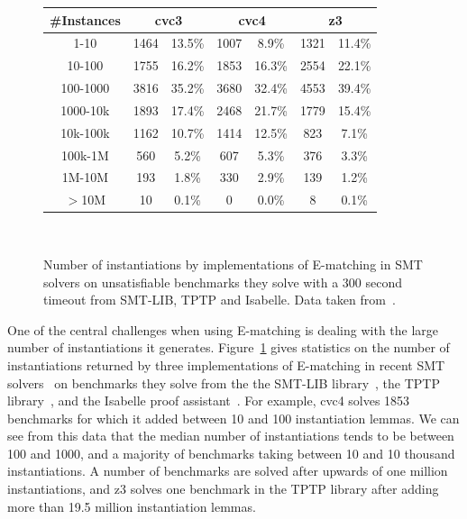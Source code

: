 \documentclass{easychair}
\begin{document}
\begin{figure}[t]
\centering
{
\begin{tabular}{|c|cc|cc|cc|}      
\hline                                                                      
\#Instances & \multicolumn{2}{c|}{{\bf cvc3}} & \multicolumn{2}{c|}{{\bf cvc4}} & \multicolumn{2}{c|}{{\bf z3}} \\
\hline   
1-10 & 1464 & 13.5\% & 1007 & 8.9\% & 1321 & 11.4\% \\
10-100 & 1755 & 16.2\% & 1853 & 16.3\% & 2554 & 22.1\% \\
100-1000 & 3816 & 35.2\% & 3680 & 32.4\% & 4553 & 39.4\% \\
1000-10k & 1893 & 17.4\% & 2468 & 21.7\% & 1779 & 15.4\% \\
10k-100k & 1162 & 10.7\% & 1414 & 12.5\% & 823 & 7.1\% \\
100k-1M & 560 & 5.2\% & 607 & 5.3\% & 376 & 3.3\% \\
1M-10M & 193 & 1.8\% & 330 & 2.9\% & 139 & 1.2\% \\
$>$10M & 10 & 0.1\% & 0 & 0.0\% & 8 & 0.1\%  \\                           
\hline                                                                
\end{tabular}
\\
}
\caption{Number of instantiations by implementations of E-matching in SMT solvers
on unsatisfiable benchmarks they solve with a 300 second timeout from SMT-LIB, TPTP and Isabelle. Data taken from~\cite{ReynoldsTinelliMoura14}.}
\label{fig:results-inst}
\end{figure}

One of the central challenges when using E-matching is dealing with the large number of instantiations it generates.
Figure~\ref{fig:results-inst} gives statistics on the number of instantiations returned by three implementations of E-matching in recent SMT solvers~\cite{DBLP:conf/cav/BarrettT07,CVC4-CAV-11,Z3}
on benchmarks they solve from the the SMT-LIB library~\cite{BarST-SMTLIB}, the TPTP library~\cite{SS98}, 
and the Isabelle proof assistant~\cite{blanchette2013extending}.
For example, cvc4 solves 1853 benchmarks for which it added between 10 and 100 instantiation lemmas.
We can see from this data that the median number of instantiations tends to be between 100 and 1000,
and a majority of benchmarks taking between 10 and 10 thousand instantiations.
A number of benchmarks are solved after upwards of one million instantiations,
and z3 solves one benchmark in the TPTP library after adding more than 19.5 million instantiation lemmas.
\end{document}
